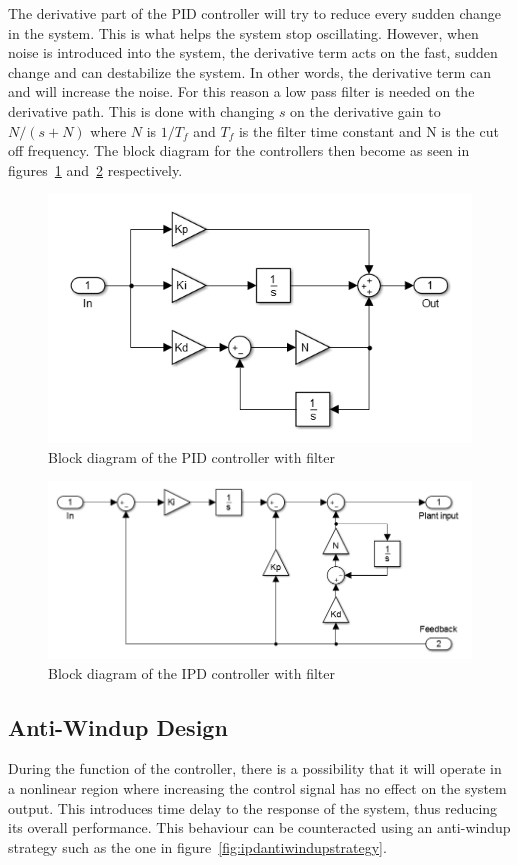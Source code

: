 The derivative part of the PID controller will try to reduce every sudden change in the system. This is what helps the system stop oscillating. However, when noise is introduced into the system, the derivative term acts on the fast, sudden change and can destabilize the system. In other words, the derivative term can and will increase the noise. For this reason a low pass filter is needed on the derivative path. This is done with changing $s$ on the derivative gain to $N/(s + N)$ where $N$ is $1/T_f$ and $T_f$ is the filter time constant and N is the cut off frequency. The block diagram for the controllers then become as seen in figures~\ref{fig:pidfilter} and~\ref{fig:ipdfilter} respectively.

\begin{figure}[!h]
	\centering
	\includegraphics[width=.7\linewidth]{graphics/pidwfilter}
	\caption{Block diagram of the PID controller with filter}
	\label{fig:pidfilter}
\end{figure}

\begin{figure}[!h]
	\centering
	\includegraphics[width=.9\linewidth]{graphics/ipdwfilter}
	\caption{Block diagram of the IPD controller with filter}
	\label{fig:ipdfilter}
\end{figure}


\subsection{Anti-Windup Design}
During the function of the controller, there is a possibility that it will operate in a nonlinear region where increasing the control signal has no effect on the system output. This introduces time delay to the response of the system, thus reducing its overall performance. This behaviour can be counteracted using an anti-windup strategy such as the one in figure~\ref{fig:ipdantiwindupstrategy}.

